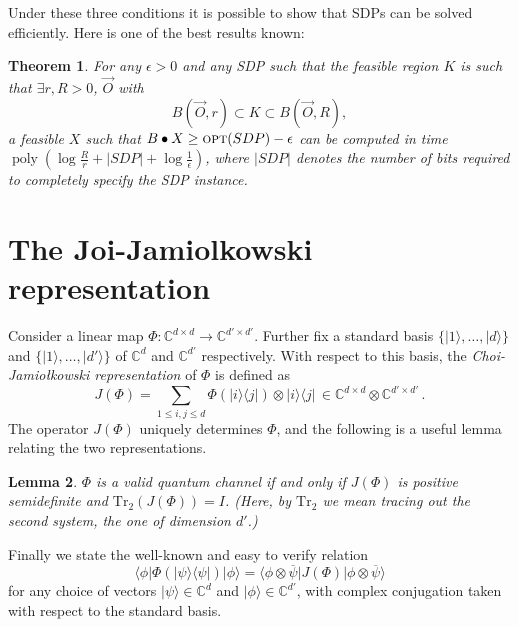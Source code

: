 \documentclass[11pt, letterpaper]{article}
\let\mathbb\relax
\let\mathbb\mathds
\newtheorem{theorem}{Theorem}[section]
\newtheorem{lemma}[theorem]{Lemma}
\theoremstyle{remark}
\theoremstyle{definition}
\numberwithin{equation}{section}
\newcommand{\1}{\mathbb{1}}
\newcommand{\Tr}{\mathrm{Tr}}
\DeclareMathOperator{\poly}{poly}
\newcommand{\ket}[1]{|#1\rangle}
\newcommand{\bra}[1]{\langle#1|}
\begin{document}
Under these three conditions it is possible to show that SDPs can be solved efficiently. Here is one of the best results known: 

\begin{theorem}
For any $\epsilon > 0$ and any SDP such that the feasible region $K$ is such that $\exists r, R > 0$, $\vec{O}$ with
$$
B(\vec{O},r)\subset K \subset B(\vec{O}, R),
$$
a feasible $X$ such that $B\bullet X\ge\textsc{opt}(SDP) -\epsilon$ can be computed in time $\poly(\log\frac{R}{r}+|SDP|+\log\frac{1}{\epsilon})$, where $|SDP|$ denotes the number of bits required to completely specify the SDP instance. 
\end{theorem}



\section{The Joi-Jamiolkowski representation}

Consider a linear map 
$\Phi:\mathbb{C}^{d\times d}\rightarrow\mathbb{C}^{d'\times d'}$. 
Further fix a standard basis $\{\ket{1},\ldots,\ket{d}\}$ and $\{\ket{1},\ldots,\ket{d'}\}$ of 
$\mathbb{C}^d$ and $\mathbb{C}^{d'}$ respectively. 
With respect to this basis, the 
\emph{Choi-Jamio{\l}kowski representation} of 
$\Phi$ is defined as
\[
J(\Phi) = \sum_{1\leq i,j\leq d} \Phi(\ket{i}\bra{j}) \otimes
\ket{i}\bra{j}\,\in \mathbb{C}^{d\times d}\otimes \mathbb{C}^{d'\times d'}\,.
\]
The operator $J(\Phi)$ uniquely determines $\Phi$, and the following is a useful lemma relating the two representations. 

\begin{lemma}
$\Phi$ is a valid quantum channel if and only if  $J(\Phi)$ is positive semidefinite and 
$\Tr_{2}(J(\Phi)) = I$. (Here, by $\Tr_2$ we mean tracing out the second system, the one of dimension $d'$.)
\end{lemma}

Finally we state the well-known and easy to verify relation
\[
\bra{\phi} \Phi(\ket{\psi}\bra{\psi}) \ket{\phi}
= \bra{\phi \otimes \overline{\psi}} J(\Phi)\ket{\phi \otimes
  \overline{\psi}}
\]
for any choice of vectors $\ket{\psi}\in\mathbb{C}^d$ and
$\ket{\phi}\in\mathbb{C}^{d'}$, with
complex conjugation taken with respect to the standard basis.
\end{document}
